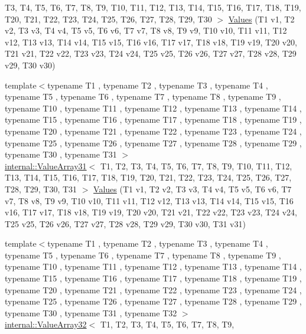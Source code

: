 \begin{DoxyCompactItemize}
\-T3, \-T4, \-T5, \-T6, \-T7, \-T8, \-T9, \*
\-T10, \-T11, \-T12, \-T13, \-T14, \-T15, \*
\-T16, \-T17, \-T18, \-T19, \-T20, \-T21, \*
\-T22, \-T23, \-T24, \-T25, \-T26, \-T27, \*
\-T28, \-T29, \-T30 $>$ \hyperlink{namespacetesting_a016767be70ad0412bdbf837bc4d3ca98}{\-Values} (\-T1 v1, \-T2 v2, \-T3 v3, \-T4 v4, \-T5 v5, \-T6 v6, \-T7 v7, \-T8 v8, \-T9 v9, \-T10 v10, \-T11 v11, \-T12 v12, \-T13 v13, \-T14 v14, \-T15 v15, \-T16 v16, \-T17 v17, \-T18 v18, \-T19 v19, \-T20 v20, \-T21 v21, \-T22 v22, \-T23 v23, \-T24 v24, \-T25 v25, \-T26 v26, \-T27 v27, \-T28 v28, \-T29 v29, \-T30 v30)
\item 
{\footnotesize template$<$typename T1 , typename T2 , typename T3 , typename T4 , typename T5 , typename T6 , typename T7 , typename T8 , typename T9 , typename T10 , typename T11 , typename T12 , typename T13 , typename T14 , typename T15 , typename T16 , typename T17 , typename T18 , typename T19 , typename T20 , typename T21 , typename T22 , typename T23 , typename T24 , typename T25 , typename T26 , typename T27 , typename T28 , typename T29 , typename T30 , typename T31 $>$ }\\\hyperlink{classtesting_1_1internal_1_1ValueArray31}{internal\-::\-Value\-Array31}$<$ \-T1, \-T2, \*
\-T3, \-T4, \-T5, \-T6, \-T7, \-T8, \-T9, \*
\-T10, \-T11, \-T12, \-T13, \-T14, \-T15, \*
\-T16, \-T17, \-T18, \-T19, \-T20, \-T21, \*
\-T22, \-T23, \-T24, \-T25, \-T26, \-T27, \*
\-T28, \-T29, \-T30, \-T31 $>$ \hyperlink{namespacetesting_a40d9696e1754455c8329a866c17ed7bb}{\-Values} (\-T1 v1, \-T2 v2, \-T3 v3, \-T4 v4, \-T5 v5, \-T6 v6, \-T7 v7, \-T8 v8, \-T9 v9, \-T10 v10, \-T11 v11, \-T12 v12, \-T13 v13, \-T14 v14, \-T15 v15, \-T16 v16, \-T17 v17, \-T18 v18, \-T19 v19, \-T20 v20, \-T21 v21, \-T22 v22, \-T23 v23, \-T24 v24, \-T25 v25, \-T26 v26, \-T27 v27, \-T28 v28, \-T29 v29, \-T30 v30, \-T31 v31)
\item 
{\footnotesize template$<$typename T1 , typename T2 , typename T3 , typename T4 , typename T5 , typename T6 , typename T7 , typename T8 , typename T9 , typename T10 , typename T11 , typename T12 , typename T13 , typename T14 , typename T15 , typename T16 , typename T17 , typename T18 , typename T19 , typename T20 , typename T21 , typename T22 , typename T23 , typename T24 , typename T25 , typename T26 , typename T27 , typename T28 , typename T29 , typename T30 , typename T31 , typename T32 $>$ }\\\hyperlink{classtesting_1_1internal_1_1ValueArray32}{internal\-::\-Value\-Array32}$<$ \-T1, \-T2, \*
\-T3, \-T4, \-T5, \-T6, \-T7, \-T8, \-T9, \*

\end{DoxyCompactItemize}
